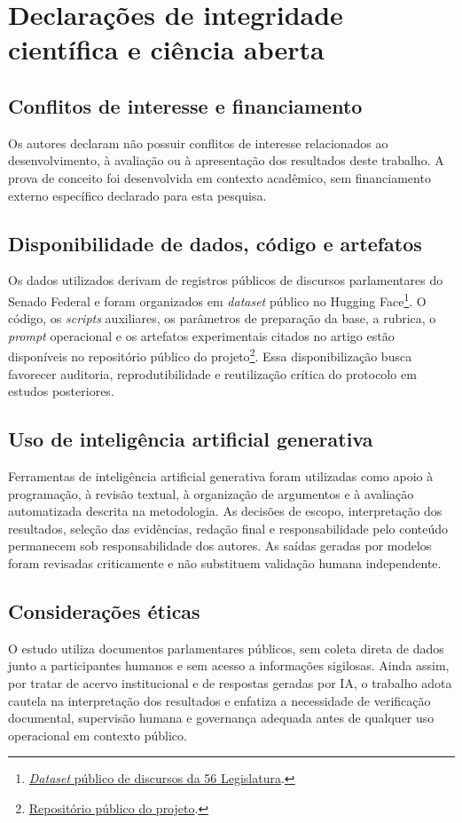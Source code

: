 \section{Declarações de integridade científica e ciência aberta}

\subsection{Conflitos de interesse e financiamento}

Os autores declaram não possuir conflitos de interesse relacionados ao desenvolvimento, à avaliação ou à apresentação dos resultados deste trabalho. A prova de conceito foi desenvolvida em contexto acadêmico, sem financiamento externo específico declarado para esta pesquisa.

\subsection{Disponibilidade de dados, código e artefatos}

Os dados utilizados derivam de registros públicos de discursos parlamentares do Senado Federal e foram organizados em \textit{dataset} público no Hugging Face\footnote{\href{https://huggingface.co/datasets/fabriciosantana/discursos-senado-legislatura-56}{\textit{Dataset} público de discursos da 56\textordfeminine{} Legislatura}.}. O código, os \textit{scripts} auxiliares, os parâmetros de preparação da base, a rubrica, o \textit{prompt} operacional e os artefatos experimentais citados no artigo estão disponíveis no repositório público do projeto\footnote{\href{https://github.com/fabriciosantana/mcdia/tree/main/05-iag/4-project}{Repositório público do projeto}.}. Essa disponibilização busca favorecer auditoria, reprodutibilidade e reutilização crítica do protocolo em estudos posteriores.

\subsection{Uso de inteligência artificial generativa}

Ferramentas de inteligência artificial generativa foram utilizadas como apoio à programação, à revisão textual, à organização de argumentos e à avaliação automatizada descrita na metodologia. As decisões de escopo, interpretação dos resultados, seleção das evidências, redação final e responsabilidade pelo conteúdo permanecem sob responsabilidade dos autores. As saídas geradas por modelos foram revisadas criticamente e não substituem validação humana independente.

\subsection{Considerações éticas}

O estudo utiliza documentos parlamentares públicos, sem coleta direta de dados junto a participantes humanos e sem acesso a informações sigilosas. Ainda assim, por tratar de acervo institucional e de respostas geradas por IA, o trabalho adota cautela na interpretação dos resultados e enfatiza a necessidade de verificação documental, supervisão humana e governança adequada antes de qualquer uso operacional em contexto público.

